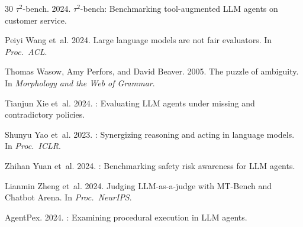 \documentclass[11pt]{article}
\begin{document}
\begin{thebibliography}{30}
$\tau^2$-bench. 2024.
\newblock $\tau^2$-bench: Benchmarking tool-augmented {LLM} agents on customer service.

Peiyi Wang et~al. 2024.
\newblock Large language models are not fair evaluators.
\newblock In \emph{Proc.\ ACL}.

Thomas Wasow, Amy Perfors, and David Beaver. 2005.
\newblock The puzzle of ambiguity.
\newblock In \emph{Morphology and the Web of Grammar}.

Tianjun Xie et~al. 2024.
: Evaluating {LLM} agents under missing and contradictory policies.

Shunyu Yao et~al. 2023.
: Synergizing reasoning and acting in language models.
\newblock In \emph{Proc.\ ICLR}.

Zhihan Yuan et~al. 2024.
: Benchmarking safety risk awareness for {LLM} agents.

Lianmin Zheng et~al. 2024.
\newblock Judging {LLM}-as-a-judge with {MT-Bench} and {Chatbot Arena}.
\newblock In \emph{Proc.\ NeurIPS}.

AgentPex. 2024.
: Examining procedural execution in {LLM} agents.

\end{thebibliography}
\end{document}
